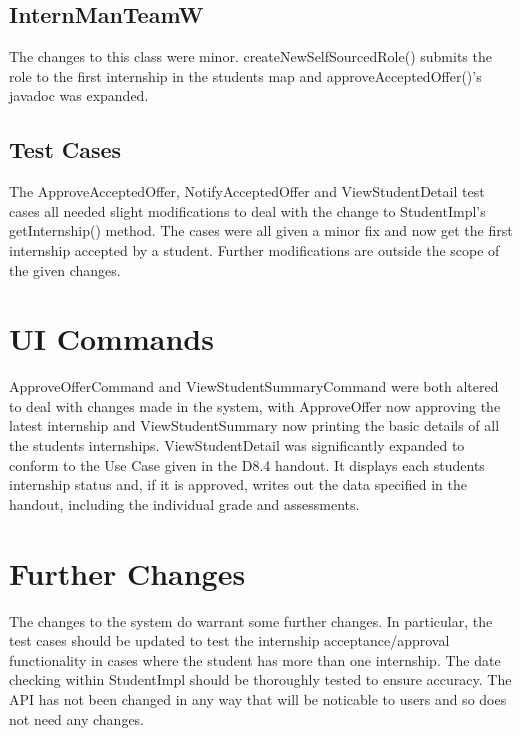 \documentclass[11pt]{l3deliverable}
\begin{document}
\subsection{InternManTeamW}

The changes to this class were minor. createNewSelfSourcedRole() submits the role to
the first internship in the students map and approveAcceptedOffer()'s javadoc was 
expanded. 

\subsection{Test Cases}

The ApproveAcceptedOffer, NotifyAcceptedOffer and ViewStudentDetail test cases all 
needed slight modifications to deal with the change to StudentImpl's getInternship()
method. The cases were all given a minor fix and now get the first internship accepted
by a student. Further modifications are outside the scope of the given changes. 

\section{UI Commands}

ApproveOfferCommand and ViewStudentSummaryCommand were both altered to deal with 
changes made in the system, with ApproveOffer now approving the latest internship
and ViewStudentSummary now printing the basic details of all the students internships.
ViewStudentDetail was significantly expanded to conform to the Use Case given in the 
D8.4 handout. It displays each students internship status and, if it is approved, 
writes out the data specified in the handout, including the individual grade and 
assessments. 

\section{Further Changes}

The changes to the system do warrant some further changes. In particular, the test
cases should be updated to test the internship acceptance/approval functionality 
in cases where the student has more than one internship. The date checking within 
StudentImpl should be thoroughly tested to ensure accuracy. The API has not been 
changed in any way that will be noticable to users and so does not need any changes.
\end{document}
